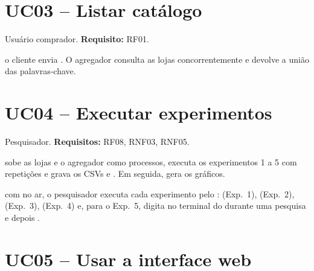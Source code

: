 \section{UC03 -- Listar catálogo}

\begin{description}[leftmargin=0pt, labelsep=0.4em, itemsep=0.15em]
  \item[Ator:] Usuário comprador. \textbf{Requisito:} RF01.
  \item[Fluxo:] o cliente envia . O agregador consulta as lojas concorrentemente e devolve a união das palavras-chave.
\end{description}

\section{UC04 -- Executar experimentos}

\begin{description}[leftmargin=0pt, labelsep=0.4em, itemsep=0.15em]
  \item[Ator:] Pesquisador. \textbf{Requisitos:} RF08, RNF03, RNF05.
  \item[Fluxo:]  sobe as lojas e o agregador como processos, executa os experimentos 1 a 5 com repetições e grava os CSVs e . Em seguida,  gera os gráficos.
  \item[Fluxo alternativo (ao vivo, na apresentação):] com  no ar, o pesquisador executa cada experimento pelo :  (Exp.~1),  (Exp.~2),  (Exp.~3),  (Exp.~4) e, para o Exp.~5, digita  no terminal do  durante uma pesquisa e depois .
\end{description}

\section{UC05 -- Usar a interface web}

